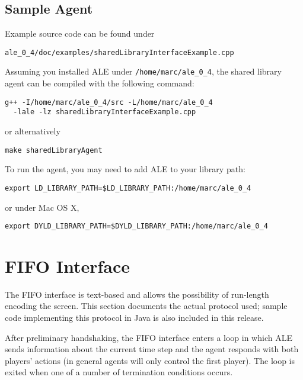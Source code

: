 \documentclass[12pt]{article}
\begin{document}
\subsection{Sample Agent}

Example source code can be found under

\begin{verbatim}
ale_0_4/doc/examples/sharedLibraryInterfaceExample.cpp
\end{verbatim}

Assuming you installed ALE under \verb+/home/marc/ale_0_4+, the shared library agent can be 
compiled with the following command: 

\begin{verbatim}
g++ -I/home/marc/ale_0_4/src -L/home/marc/ale_0_4 
  -lale -lz sharedLibraryInterfaceExample.cpp 
\end{verbatim}

or alternatively

\begin{verbatim}
make sharedLibraryAgent
\end{verbatim}

To run the agent, you may need to add ALE to your library path:

\begin{verbatim}
export LD_LIBRARY_PATH=$LD_LIBRARY_PATH:/home/marc/ale_0_4
\end{verbatim}

or under Mac OS X,

\begin{verbatim}
export DYLD_LIBRARY_PATH=$DYLD_LIBRARY_PATH:/home/marc/ale_0_4
\end{verbatim}

\section{FIFO Interface}\label{sec:pipes_interface}

The FIFO interface is text-based and allows the possibility of run-length encoding the screen. This section documents the actual protocol used; sample code implementing this protocol in Java is also included in this release.

After preliminary handshaking, the FIFO interface enters a loop in which ALE sends information about the current time step and the agent responds with both players' actions (in general agents will only control the first player). The loop is exited when one of a number of termination conditions occurs.
\end{document}
